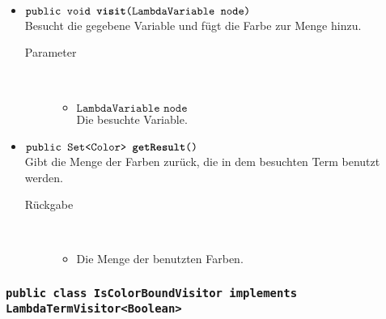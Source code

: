 \begin{description}
\begin{itemize}
		\item $\texttt{public void \textbf{visit}(LambdaVariable node)}$ \\ Besucht die gegebene Variable und fügt die Farbe zur Menge hinzu.
		\begin{description}
			\item[Parameter] \hfill \\
			\vspace{-.8cm}
			\begin{itemize}
				\item $\texttt{LambdaVariable node}$ \\ Die besuchte Variable.
			\end{itemize}
		\end{description}
		
		\item $\texttt{public Set<Color> \textbf{getResult}()}$ \\ Gibt die Menge der Farben zurück, die in dem besuchten Term benutzt werden.
		\begin{description}
			\item[Rückgabe] \hfill \\
			\vspace{-.8cm}
			\begin{itemize}
				\item Die Menge der benutzten Farben.
			\end{itemize}
		\end{description}
	\end{itemize}
\end{description}

\subsubsection{\normalfont \texttt{public class \textbf{IsColorBoundVisitor} implements LambdaTermVisitor<Boolean>}}

